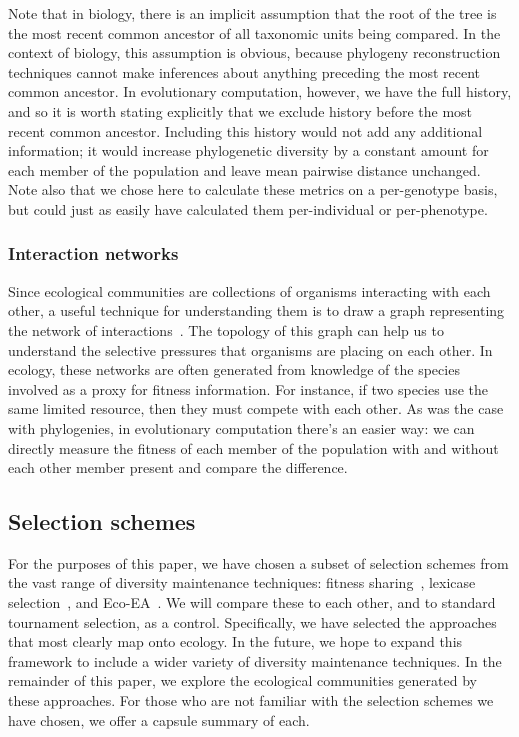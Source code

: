 Note that in biology, there is an implicit assumption that the root of the tree is the most recent common ancestor of all taxonomic units being compared. In the context of biology, this assumption is obvious, because phylogeny reconstruction techniques cannot make inferences about anything preceding the most recent common ancestor. In evolutionary computation, however, we have the full history, and so it is worth stating explicitly that we exclude history before the most recent common ancestor. Including this history would not add any additional information; it would increase phylogenetic diversity by a constant amount for each member of the population and leave mean pairwise distance unchanged. Note also that we chose here to calculate these metrics on a per-genotype basis, but could just as easily have calculated them per-individual or per-phenotype.

\subsubsection{Interaction networks}
Since ecological communities are collections of organisms interacting with each other, a useful technique for understanding them is to draw a graph representing the network of interactions~\cite{fontaine_ecological_2011}. The topology of this graph can help us to understand the selective pressures that organisms are placing on each other. In ecology, these networks are often generated from knowledge of the species involved as a proxy for fitness information. For instance, if two species use the same limited resource, then they must compete with each other. As was the case with phylogenies, in evolutionary computation there's an easier way: we can directly measure the fitness of each member of the population with and without each other member present and compare the difference.

\subsection{Selection schemes}

For the purposes of this paper, we have chosen a subset of selection schemes from the vast range of diversity maintenance techniques:
fitness sharing~\cite{goldberg_genetic_1987}, lexicase selection~\cite{spector_assessment_2012}, and Eco-EA~\cite{goings_ecological_2009}. We will compare these to each other, and to standard tournament selection, as a control. Specifically, we have selected the approaches that most clearly map onto ecology. In the future, we hope to expand this framework to include a wider variety of diversity maintenance techniques. In the remainder of this paper, we explore the ecological communities generated by these approaches. For those who are not familiar with the selection schemes we have chosen, we offer a capsule summary of each.

